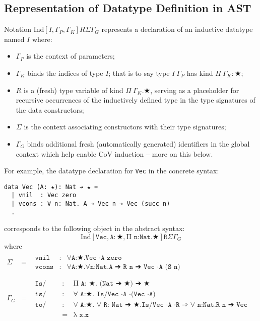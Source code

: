 \documentclass{article}
\newcommand{\ann}[2]{#1\! : \! #2}
\newcommand{\indsche}[3]{\ensuremath{\text{Ind}[#1,#2,#3]}}
\begin{document}
\subsection{Representation of Datatype Definition in AST}

Notation $\indsche{I}{\Gamma_P}{\Gamma_K}{R}{\Sigma}{\Gamma_G}$ represents a declaration of
an inductive datatype named $I$ where:
\begin{itemize}
\item $\Gamma_P$ is the context of parameters;
\item $\Gamma_K$ binds the indices of type $I$; that is to say type $I\ \Gamma_P$ has kind
  $Π\ \Gamma_K: ★$;
\item $R$ is a (fresh) type variable of kind $Π\ \Gamma_K. ★$, serving as a placeholder for
  recursive occurrences of the inductively defined type in the type signatures
  of the data constructors;
\item $\Sigma$ is the context associating constructors with their type
  signatures;
\item $\Gamma_G$ binds additional fresh (automatically generated) identifiers in
  the global context which help enable CoV induction -- more on this below.
\end{itemize}

For example, the datatype declaration for \texttt{Vec} in the concrete syntax:
\begin{verbatim}
data Vec (A: ★): Nat ➔ ★ =
  | vnil  : Vec zero
  | vcons : ∀ n: Nat. A ➔ Vec n ➔ Vec (succ n)
  .
\end{verbatim}

corresponds to the following object in the abstract syntax:
\[
  \indsche{\texttt{Vec}}{\ann{\texttt{A}}{★}}{\texttt{Π n:Nat.★}}{\texttt{R}}{\Sigma}{\Gamma_G}
\]
\noindent where
\[
  \begin{array}{lcl}
    \Sigma
    & =
    & \begin{array}{lcl}
        \texttt{vnil} & : & \texttt{∀A:★.Vec ·A zero}
        \\ \texttt{vcons} & : & \texttt{∀A:★.∀n:Nat.A ➔ R n ➔ Vec ·A (S n)}
      \end{array}
    \\ \\ \Gamma_G
    & =
    & \begin{array}{lcl}
        \texttt{Is/Vec} & : & \texttt{Π A: ★. (Nat ➔ ★) ➔ ★}
        \\ \texttt{is/Vec} & : & \texttt{∀ A:★. Is/Vec ·A ·(Vec ·A)}
        \\ \texttt{to/Vec} & : & \texttt{∀ A:★. ∀ R: Nat ➔ ★.Is/Vec ·A ·R ➾ ∀ n:Nat.R n ➔ Vec ·A n}
        \\                 & = & \texttt{λ x.x}
      \end{array}
  \end{array}
\]
\end{document}
